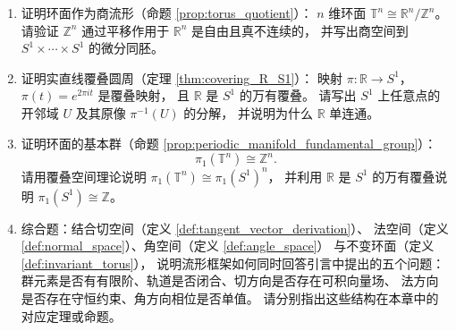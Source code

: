 \begin{enumerate}[leftmargin=3em, label=\textbf{题 \arabic*}]
    \item 证明环面作为商流形（命题 \ref{prop:torus_quotient}）：
    $n$ 维环面 $\mathbb{T}^n\cong\mathbb{R}^n/\mathbb{Z}^n$。
    请验证 $\mathbb{Z}^n$ 通过平移作用于 $\mathbb{R}^n$ 是自由且真不连续的，
    并写出商空间到 $S^1\times\cdots\times S^1$ 的微分同胚。

    \item 证明实直线覆叠圆周（定理 \ref{thm:covering_R_S1}）：
    映射 $\pi:\mathbb{R}\to S^1$，$\pi(t)=e^{2\pi it}$ 是覆叠映射，
    且 $\mathbb{R}$ 是 $S^1$ 的万有覆叠。
    请写出 $S^1$ 上任意点的开邻域 $U$ 及其原像 $\pi^{-1}(U)$ 的分解，
    并说明为什么 $\mathbb{R}$ 单连通。

    \item 证明环面的基本群（命题 \ref{prop:periodic_manifold_fundamental_group}）：
    \[
    \pi_1(\mathbb{T}^n)\cong\mathbb{Z}^n.
    \]
    请用覆叠空间理论说明 $\pi_1(\mathbb{T}^n)\cong\pi_1(S^1)^n$，
    并利用 $\mathbb{R}$ 是 $S^1$ 的万有覆叠说明 $\pi_1(S^1)\cong\mathbb{Z}$。

    \item 综合题：结合切空间（定义 \ref{def:tangent_vector_derivation}）、
    法空间（定义 \ref{def:normal_space}）、角空间（定义 \ref{def:angle_space}）
    与不变环面（定义 \ref{def:invariant_torus}），
    说明流形框架如何同时回答引言中提出的五个问题：
    群元素是否有有限阶、轨道是否闭合、切方向是否存在可积向量场、
    法方向是否存在守恒约束、角方向相位是否单值。
    请分别指出这些结构在本章中的对应定理或命题。
\end{enumerate}

